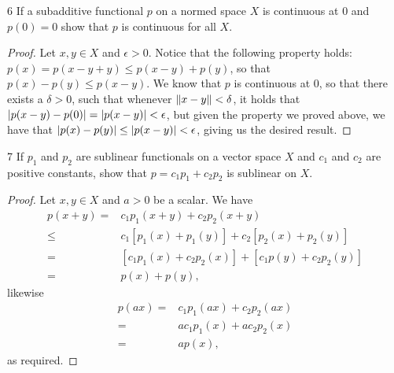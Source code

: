 \begin{exercise}{6}
If a subadditive functional $p$ on a normed space $X$ is continuous at 0 and $p(0) = 0$ show that $p$ is continuous for all $X$.
\end{exercise}
\begin{proof}
Let $x,y \in X$ and $\epsilon >0$.
Notice that the following property holds: 
$p(x) = p(x-y + y) \leq p(x-y) + p(y)$, so that $p(x) - p(y) \leq p(x-y)$.
We know that $p$ is continuous at 0, so that there exists a $\delta > 0$, such that whenever $\left\lVert x-y\right\rVert < \delta$, it holds that $\left\lvert p(x-y) - p(0)\right\rvert = \left\lvert p(x-y)\right\rvert < \epsilon$, but given the property we proved above, we have that $\left\lvert p(x) - p(y)\right\rvert \leq \left\lvert p(x-y)\right\rvert < \epsilon$, giving us the desired result.
\end{proof} 

\begin{exercise}{7}
If $p_1$ and $p_2$ are sublinear functionals on a vector space $X$ and $c_1$ and $c_2$ are positive constants, show that $p = c_1p_1 + c_2p_2$ is sublinear on $X$.
\end{exercise}
\begin{proof}
Let $x, y\in X$ and $a > 0$ be a scalar.
We have
\begin{align*}
    p(x + y)
    =& c_1p_1(x + y) + c_2p_2(x + y)\\
    \leq& c_1[p_1(x) + p_1(y)] + c_2[p_2(x) + p_2(y)]\\
    =& [c_1p_1(x) + c_2p_2(x)] + [c_1p(y) + c_2p_2(y)]\\
    =& p(x) + p(y),
\end{align*}
likewise
\begin{align*}
    p(ax)
    =& c_1p_1(ax) + c_2p_2(ax)\\
    =& ac_1p_1(x) +ac_2p_2(x)\\
    =& ap(x),
\end{align*}
as required.
\end{proof} 

